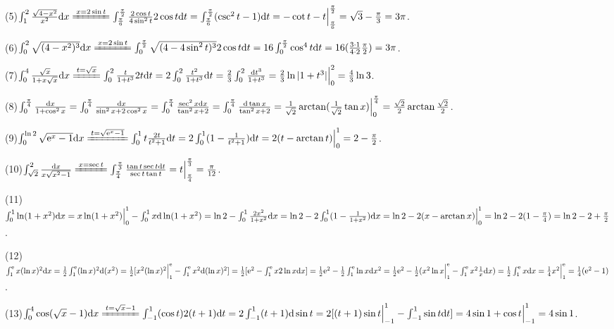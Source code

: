 \documentclass[12pt,UTF8]{ctexart}
\begin{document}
\begin{enumerate}
(5)$\int_1^2\frac{\sqrt{4-x^2}}{x^2}\mathrm dx\xlongequal{x=2\sin t}\int_{\frac\pi6}^{\frac\pi2}\frac{2\cos t}{4\sin^2t}2\cos t\mathrm dt=\int_{\frac\pi6}^{\frac\pi2}(\csc^2t-1)\mathrm dt=-\cot t-t\Big|_{\frac\pi6}^{\frac\pi2}=\sqrt3-\frac\pi3=3\pi$.

(6)$\int_0^2\sqrt{(4-x^2)^3}\mathrm dx\xlongequal{x=2\sin t}\int_0^{\frac\pi2}\sqrt{(4-4\sin^2t)^3}2\cos t\mathrm dt=16\int_0^{\frac\pi2}\cos^4t\mathrm dt=16(\frac{3\cdot1}{4\cdot2}\frac\pi2)\\
=3\pi$.

(7)$\int_0^4\frac{\sqrt x}{1+x\sqrt x}\mathrm dx\xlongequal{t=\sqrt x}\int_0^2\frac t{1+t^3}2t\mathrm dt=2\int_0^2\frac{t^2}{1+t^3}\mathrm dt=\frac23\int_0^2\frac{\mathrm dt^3}{1+t^3}=\frac23\ln|1+t^3|\Big|_0^2=\frac43\ln3$.

(8)$\int_0^{\frac\pi4}\frac{\mathrm dx}{1+\cos^2x}=\int_0^{\frac\pi4}\frac{\mathrm dx}{\sin^2x+2\cos^2x}=\int_0^{\frac\pi4}\frac{\sec^2x\mathrm dx}{\tan^2x+2}=\int_0^{\frac\pi4}\frac{\mathrm d\tan x}{\tan^2x+2}=\frac1{\sqrt2}\arctan(\frac1{\sqrt2}\tan x)\Big|_0^{\frac\pi4}\\
=\frac{\sqrt2}2\arctan\frac{\sqrt2}2$.

(9)$\int_0^{\ln 2}\sqrt{\mathrm e^x-1}\mathrm dx\xlongequal{t=\sqrt{\mathrm e^x-1}}\int_0^1t\frac{2t}{t^2+1}\mathrm dt=2\int_0^1(1-\frac1{t^2+1})\mathrm dt=2(t-\arctan t)\Big|_0^1=2-\frac\pi2$.

(10)$\int_{\sqrt2}^2\frac{\mathrm dx}{x\sqrt{x^2-1}}\xlongequal{x=\sec t}\int_{\frac\pi4}^{\frac\pi3}\frac{\tan t\sec t\mathrm dt}{\sec t\tan t}=t\Big|_{\frac\pi4}^{\frac\pi3}=\frac\pi{12}$.

(11)$\int_0^1\ln(1+x^2)\mathrm dx=x\ln(1+x^2)\Big|_0^1-\int_0^1x\mathrm d\ln(1+x^2)=\ln2-\int_0^1\frac{2x^2}{1+x^2}\mathrm dx\\
=\ln2-2\int_0^1(1-\frac1{1+x^2})\mathrm dx=\ln2-2(x-\arctan x)\Big|_0^1=\ln2-2(1-\frac\pi4)=\ln2-2+\frac\pi2$.

(12)$\int_1^{\mathrm e}x(\ln x)^2\mathrm dx=\frac12\int_1^{\mathrm e}(\ln x)^2\mathrm d(x^2)=\frac12[x^2(\ln x)^2\Big|_1^{\mathrm e}-\int_1^{\mathrm e}x^2\mathrm d(\ln x)^2]=\frac12[\mathrm e^2-\int_1^{\mathrm e}x2\ln x\mathrm dx]\\
=\frac12\mathrm e^2-\frac12\int_1^{\mathrm e}\ln x\mathrm dx^2=\frac12\mathrm e^2-\frac12(x^2\ln x\Big|_1^{\mathrm e}-\int_1^{\mathrm e}x^2\frac1x\mathrm dx)=\frac12\int_1^{\mathrm e}x\mathrm dx=\frac14x^2\Big|_1^{\mathrm e}=\frac14(\mathrm e^2-1)$.

(13)$\int_0^4\cos(\sqrt x-1)\mathrm dx\xlongequal{t=\sqrt x-1}\int_{-1}^1(\cos t)2(t+1)\mathrm dt=2\int_{-1}^1(t+1)\mathrm d\sin t\\
=2[(t+1)\sin t\Big|_{-1}^1-\int_{-1}^1\sin t\mathrm dt]=4\sin1+\cos t\Big|_{-1}^1=4\sin1$.


\end{enumerate}
\end{document}
